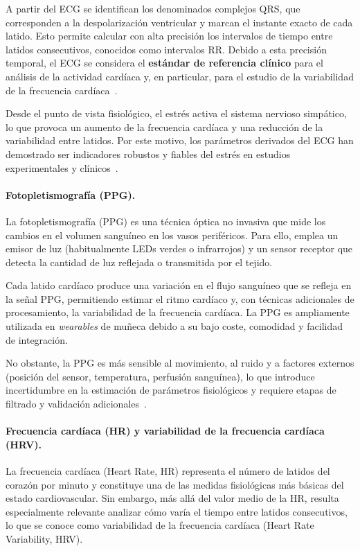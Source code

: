\documentclass{report}
\begin{document}
A partir del ECG se identifican los denominados complejos QRS, que corresponden a la despolarización ventricular y marcan el instante exacto de cada latido. Esto permite calcular con alta precisión los intervalos de tiempo entre latidos consecutivos, conocidos como intervalos RR.  
Debido a esta precisión temporal, el ECG se considera el \textbf{estándar de referencia clínico} para el análisis de la actividad cardíaca y, en particular, para el estudio de la variabilidad de la frecuencia cardíaca~\cite{Shaffer2017}.

Desde el punto de vista fisiológico, el estrés activa el sistema nervioso simpático, lo que provoca un aumento de la frecuencia cardíaca y una reducción de la variabilidad entre latidos. Por este motivo, los parámetros derivados del ECG han demostrado ser indicadores robustos y fiables del estrés en estudios experimentales y clínicos~\cite{Kim2018}.

\paragraph{Fotopletismografía (PPG).}
La fotopletismografía (PPG) es una técnica óptica no invasiva que mide los cambios en el volumen sanguíneo en los vasos periféricos. Para ello, emplea un emisor de luz (habitualmente LEDs verdes o infrarrojos) y un sensor receptor que detecta la cantidad de luz reflejada o transmitida por el tejido.

Cada latido cardíaco produce una variación en el flujo sanguíneo que se refleja en la señal PPG, permitiendo estimar el ritmo cardíaco y, con técnicas adicionales de procesamiento, la variabilidad de la frecuencia cardíaca.  
La PPG es ampliamente utilizada en \textit{wearables} de muñeca debido a su bajo coste, comodidad y facilidad de integración.

No obstante, la PPG es más sensible al movimiento, al ruido y a factores externos (posición del sensor, temperatura, perfusión sanguínea), lo que introduce incertidumbre en la estimación de parámetros fisiológicos y requiere etapas de filtrado y validación adicionales~\cite{Schafer2013}.

\paragraph{Frecuencia cardíaca (HR) y variabilidad de la frecuencia cardíaca (HRV).}
La frecuencia cardíaca (Heart Rate, HR) representa el número de latidos del corazón por minuto y constituye una de las medidas fisiológicas más básicas del estado cardiovascular.  
Sin embargo, más allá del valor medio de la HR, resulta especialmente relevante analizar cómo varía el tiempo entre latidos consecutivos, lo que se conoce como variabilidad de la frecuencia cardíaca (Heart Rate Variability, HRV).
\end{document}
